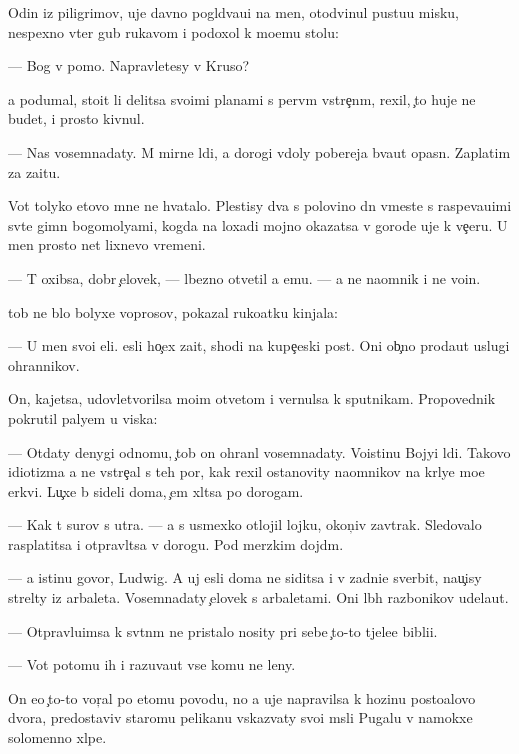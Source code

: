 \documentclass[10pt]{book}
\begin{document}
Odin iz piligrimov, uje davno pogl{\ia}d{\yi}va{\y}u{\x}i{\y} na men{\ia}, otodvinul pustu{\y}u misku, nespexno v{\yi}ter gub{\yi} rukavom i podoxol k mo{\y}emu stolu:

— Bog v pomo{\x}. Napravl{\ia}{\y}etesy v Kruso?

{\Y}a podumal, sto{\y}it li delitsa svo{\y}imi planami s perv{\yi}m vstre{\c}n{\yi}m, rexil, {\c}to huje ne budet, i prosto kivnul.

— Nas vosemnad{\q}aty. M{\yi} mirn{\yi}{\y}e l{\iu}di, a dorogi vdoly poberej{\y}a b{\yi}va{\y}ut opasn{\yi}. Zaplatim za za{\x}itu.

Vot tolyko etovo mne ne hvatalo. Plestisy dva s polovino{\y} dn{\ia} vmeste s raspeva{\y}u{\x}imi sv{\ia}t{\yi}{\y}e gimn{\yi} bogomoly{\q}ami, kogda na loxadi mojno okazatsa v gorode uje k ve{\c}eru. U men{\ia} prosto net lixnevo vremeni.

— T{\yi} oxibsa, dobr{\yi}{\y} {\c}elovek, — l{\iu}bezno otvetil {\y}a {\y}emu. — {\Y}a ne na{\y}omnik i ne vo{\y}in.

{\C}tob{\yi} ne b{\yi}lo bolyxe voprosov, pokazal ruko{\y}atku kinjala:

— U men{\ia} svo{\y}i {\q}eli. {\Y}esli ho{\c}ex za{\x}it{\yi}, shodi na kupe{\c}eski{\y} post. Oni ob{\yi}{\c}no proda{\y}ut uslugi ohrannikov.

On, kajetsa, udovletvorilsa mo{\y}im otvetom i vernulsa k sputnikam. Propovednik pokrutil paly{\q}em u viska:

— Otdaty denygi odnomu, {\c}tob{\yi} on ohran{\ia}l vosemnad{\q}aty. Voistinu Bojyi l{\iu}di. Takovo idiotizma {\y}a ne vstre{\c}al s teh por, kak rexil ostanovity na{\y}omnikov na kr{\yi}ly{\q}e mo{\y}e{\y} {\q}erkvi. Lu{\c}xe b{\yi} sideli doma, {\c}em xl{\ia}tsa po dorogam.

— Kak t{\yi} surov s utra. — {\Y}a s usmexko{\y} otlojil lojku, okon{\c}iv zavtrak. Sledovalo rasplatitsa i otpravl{\ia}tsa v dorogu. Pod merzkim dojd{\e}m.

— {\Y}a istinu govor{\iu}, Ludwig. A uj {\y}esli doma ne siditsa i v zadni{\q}e sverbit, nau{\c}isy strel{\ia}ty iz arbaleta. Vosemnad{\q}aty {\c}elovek s arbaletami. Oni l{\iu}b{\yi}h razbo{\y}nikov udela{\y}ut.

— Otpravl{\ia}{\y}u{\x}imsa k sv{\ia}t{\yi}n{\ia}m ne pristalo nosity pri sebe {\c}to-to t{\ia}jele{\y}e bibli{\y}i.

— Vot potomu ih i razuva{\y}ut vse komu ne leny.

On {\y}e{\x}o {\c}to-to vor{\c}al po etomu povodu, no {\y}a uje napravilsa k hoz{\ia}{\y}inu posto{\y}alovo dvora, predostaviv staromu pelikanu v{\yi}skaz{\yi}vaty svo{\y}i m{\yi}sli Pugalu v namokxe{\y} solomenno{\y} xl{\ia}pe.
\end{document}
